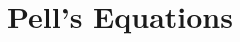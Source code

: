 \documentclass[../../main.tex]{subfiles}
\begin{document}
\section{Pell's Equations}
\end{document}
